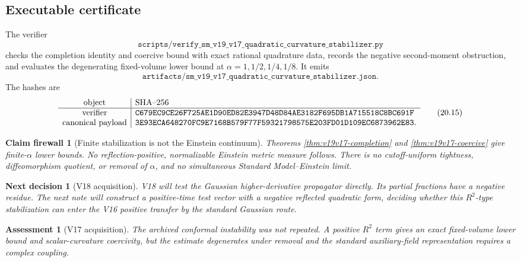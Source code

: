 \documentclass[11pt]{article}
\newtheorem{firewall}[theorem]{Claim firewall}
\newtheorem{decision}[theorem]{Next decision}
\newtheorem{assessment}[theorem]{Assessment}
\theoremstyle{remark}
\begin{document}
\subsection{Executable certificate}

The verifier
\[
 \texttt{scripts/verify\_sm\_v19\_v17\_quadratic\_curvature\_stabilizer.py}
                                                                  \tag{20.13}
\]
checks the completion identity and coercive bound with exact rational
quadrature data, records the negative second-moment obstruction, and
evaluates the degenerating fixed-volume lower bound at
\(\alpha=1,1/2,1/4,1/8\).  It emits
\[
 \texttt{artifacts/sm\_v19\_v17\_quadratic\_curvature\_stabilizer.json}.
                                                                  \tag{20.14}
\]
The hashes are
\[
\begin{array}{c|l}
\hbox{object}&\hbox{SHA--256}\\ \hline
\hbox{verifier}&
\texttt{C679EC9CE26F725AE1D90ED82E3947D48D84AE3182F695DB1A715518C8BC691F}\\
\hbox{canonical payload}&
\texttt{3E93ECA648270FC9E7168B579F77F59321798575E203FD01D109EC6873962E83}.
\end{array}                                                     \tag{20.15}
\]

\begin{firewall}[Finite stabilization is not the Einstein continuum]
\label{fire:v19v17}
Theorems \ref{thm:v19v17-completion} and
\ref{thm:v19v17-coercive} give finite-\(\alpha\) lower bounds.  No
reflection-positive, normalizable Einstein metric measure follows.
There is no cutoff-uniform tightness, diffeomorphism quotient, or removal
of \(\alpha\), and no simultaneous Standard Model--Einstein limit.
\end{firewall}

\begin{decision}[V18 acquisition]
\label{dec:v19v17-next}
V18 will test the Gaussian higher-derivative propagator directly.  Its
partial fractions have a negative residue.  The next note will construct
a positive-time test vector with a negative reflected quadratic form,
deciding whether this \(R^2\)-type stabilization can enter the V16
positive transfer by the standard Gaussian route.
\end{decision}

\begin{assessment}[V17 acquisition]
\label{ass:v19v17}
The archived conformal instability was not repeated.  A positive \(R^2\)
term gives an exact fixed-volume lower bound and scalar-curvature
coercivity, but the estimate degenerates under removal and the standard
auxiliary-field representation requires a complex coupling.
\end{assessment}
\end{document}
